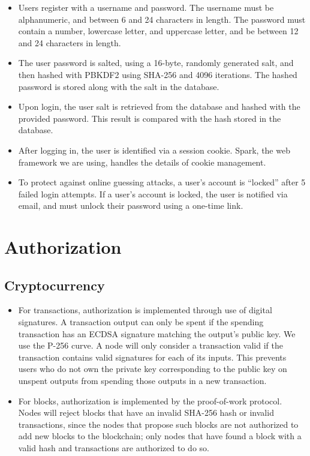 \documentclass[a4paper,12pt]{article}
\begin{document}
\begin{itemize}
\item Users register with a username and password. The username must be alphanumeric, and between 6 and 24 characters in length. The password must contain a number, lowercase letter, and uppercase letter, and be between 12 and 24 characters in length.
\item The user password is salted, using a 16-byte, randomly generated salt, and then hashed with PBKDF2 using SHA-256 and 4096 iterations. The hashed password is stored along with the salt in the database.
\item Upon login, the user salt is retrieved from the database and hashed with the provided password. This result is compared with the hash stored in the database.
\item After logging in, the user is identified via a session cookie. Spark, the web framework we are using, handles the details of cookie management.
\item To protect against online guessing attacks, a user's account is ``locked'' after 5 failed login attempts. If a user's account is locked, the user is notified via email, and must unlock their password using a one-time link.
\end{itemize}


\section{Authorization}
\subsection{Cryptocurrency}
\begin{itemize}
\item For transactions, authorization is implemented through use of digital signatures. A transaction output can only be spent if the spending transaction has an ECDSA signature matching the output's public key.
We use the P-256 curve.
A node will only consider a transaction valid if the transaction contains valid signatures for each of its inputs.
This prevents users who do not own the private key corresponding to the public key on unspent outputs from spending those outputs in a new transaction.
\item For blocks, authorization is implemented by the proof-of-work protocol.
Nodes will reject blocks that have an invalid SHA-256 hash or invalid transactions, since the nodes that propose such blocks are not authorized to add new blocks to the blockchain; only nodes that have found a block with a valid hash and transactions are authorized to do so.
\end{itemize}
\end{document}
